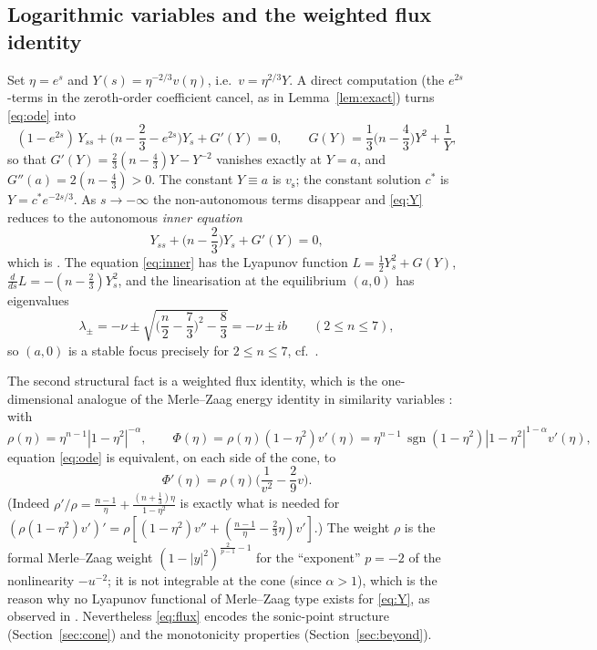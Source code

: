 \documentclass[11pt,a4paper]{amsart}
\theoremstyle{definition}
\theoremstyle{remark}
\newcommand{\cstar}{c^{*}}
\newcommand{\vs}{v_{\mathrm{s}}}
\DeclareMathOperator{\sgn}{sgn}
\begin{document}
\subsection{Logarithmic variables and the weighted flux identity}
Set $\eta=e^{s}$ and $Y(s)=\eta^{-2/3}v(\eta)$, i.e.\ $v=\eta^{2/3}Y$.  A direct computation (the $e^{2s}$-terms in the zeroth-order coefficient cancel, as in Lemma~\ref{lem:exact}) turns \eqref{eq:ode} into
\begin{equation}\label{eq:Y}
(1-e^{2s})\,Y_{ss}+\Big(n-\frac23-e^{2s}\Big)Y_s+G'(Y)=0,\qquad
G(Y)=\frac13\Big(n-\frac43\Big)Y^2+\frac1Y ,
\end{equation}
so that $G'(Y)=\frac23(n-\frac43)Y-Y^{-2}$ vanishes exactly at $Y=a$, and $G''(a)=2(n-\frac43)>0$.  The constant $Y\equiv a$ is $\vs$; the constant solution $\cstar$ is $Y=\cstar e^{-2s/3}$.  As $s\to-\infty$ the non-autonomous terms disappear and \eqref{eq:Y} reduces to the autonomous \emph{inner equation}
\begin{equation}\label{eq:inner}
Y_{ss}+\Big(n-\frac23\Big)Y_s+G'(Y)=0,
\end{equation}
which is \cite[(2.14)]{GHL22}.  The equation \eqref{eq:inner} has the Lyapunov function $L=\frac12Y_s^2+G(Y)$, $\frac{d}{ds}L=-(n-\frac23)Y_s^2$, and the linearisation at the equilibrium $(a,0)$ has eigenvalues
\begin{equation}\label{eq:eigen}
\lambda_\pm=-\nu\pm\sqrt{\Big(\frac n2-\frac73\Big)^2-\frac83}
=-\nu\pm i b\qquad(2\le n\le 7),
\end{equation}
so $(a,0)$ is a stable focus precisely for $2\le n\le7$, cf.\ \cite[(2.17)]{GHL22}.

The second structural fact is a weighted flux identity, which is the one-dimensional analogue of the Merle--Zaag energy identity in similarity variables \cite{MZ03,MZ05}: with
\begin{equation}\label{eq:weight}
\rho(\eta)=\eta^{n-1}|1-\eta^2|^{-\alpha},\qquad \Phi(\eta)=\rho(\eta)(1-\eta^2)v'(\eta)=\eta^{n-1}\,\sgn(1-\eta^2)|1-\eta^2|^{1-\alpha}v'(\eta),
\end{equation}
equation \eqref{eq:ode} is equivalent, on each side of the cone, to
\begin{equation}\label{eq:flux}
\Phi'(\eta)=\rho(\eta)\Big(\frac{1}{v^2}-\frac29v\Big).
\end{equation}
(Indeed $\rho'/\rho=\frac{n-1}{\eta}+\frac{(n+\frac13)\eta}{1-\eta^2}$ is exactly what is needed for $(\rho(1-\eta^2)v')'=\rho[(1-\eta^2)v''+(\frac{n-1}\eta-\frac23\eta)v']$.)  The weight $\rho$ is the formal Merle--Zaag weight $(1-|y|^2)^{\frac{2}{p-1}-1}$ for the ``exponent'' $p=-2$ of the nonlinearity $-u^{-2}$; it is not integrable at the cone (since $\alpha>1$), which is the reason why no Lyapunov functional of Merle--Zaag type exists for \eqref{eq:Y}, as observed in \cite{GHL22}.  Nevertheless \eqref{eq:flux} encodes the sonic-point structure (Section~\ref{sec:cone}) and the monotonicity properties (Section~\ref{sec:beyond}).
\end{document}
